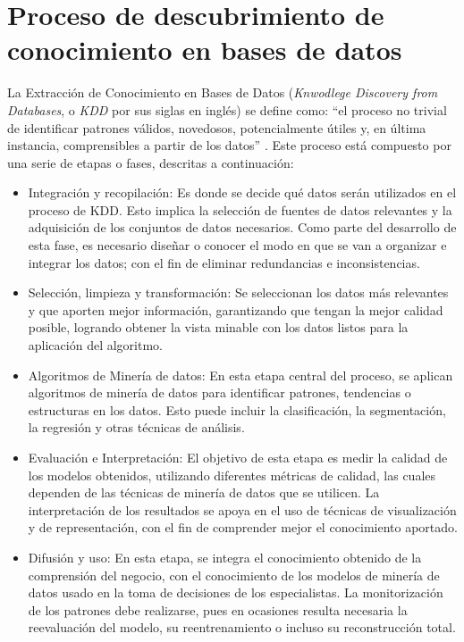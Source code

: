 \section{Proceso de descubrimiento de conocimiento en bases de datos}\label{kdd}
La Extracción de Conocimiento en Bases de Datos (\textit{Knwodlege Discovery from Databases}, o \textit{KDD} por sus siglas en inglés) se define como: “el proceso no trivial de identificar patrones válidos, novedosos, potencialmente útiles y, en última instancia, comprensibles a partir de los datos” \citep{orallo2004}. Este proceso está compuesto por una serie de etapas o fases, descritas a continuación:
\begin{itemize}
	\item Integración y recopilación: Es donde se decide qué datos serán utilizados en el proceso de KDD. Esto implica la selección de fuentes de datos relevantes y la adquisición de los conjuntos de datos necesarios.  Como parte del desarrollo de esta fase, es necesario diseñar o conocer el modo en que se van a organizar e integrar los datos; con el fin de eliminar redundancias e inconsistencias.
	\item Selección, limpieza y transformación: Se seleccionan los datos más relevantes y que aporten mejor información, garantizando que tengan la mejor calidad posible, logrando obtener la vista minable con los datos listos para la aplicación del algoritmo.
	\item Algoritmos de Minería de datos: En esta etapa central del proceso, se aplican algoritmos de minería de datos para identificar patrones, tendencias o estructuras en los datos. Esto puede incluir la clasificación, la segmentación, la regresión y otras técnicas de análisis.
	\item Evaluación e Interpretación: El objetivo de esta etapa es medir la calidad de los modelos obtenidos, utilizando diferentes métricas de calidad, las cuales dependen de las técnicas de minería de datos que se utilicen. La interpretación de los resultados se apoya en el uso de técnicas de visualización y de representación, con el fin de comprender mejor el conocimiento aportado. 
	\item Difusión y uso: En esta etapa, se integra el conocimiento obtenido de la comprensión del negocio, con el conocimiento de los modelos de minería de datos usado en la toma de decisiones de los especialistas. La monitorización de los patrones debe realizarse, pues en ocasiones resulta necesaria la reevaluación del modelo, su reentrenamiento o incluso su reconstrucción total.
\end{itemize}

